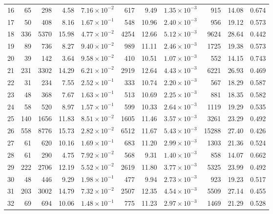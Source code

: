 \begin{table}[ht]
\begin{adjustbox}{width=\textwidth}
\begin{tabular}{lrrrrrrrrrr}
  16 & 65 & 298 & 4.58 & $7.16 \times 10^{-2}$ & 617 & 9.49 & $1.35 \times 10^{-3}$ & 915 & 14.08 & 0.674 \\ 
  17 & 50 & 408 & 8.16 & $1.67 \times 10^{-1}$ & 548 & 10.96 & $2.40 \times 10^{-3}$ & 956 & 19.12 & 0.573 \\ 
  18 & 336 & 5370 & 15.98 & $4.77 \times 10^{-2}$ & 4254 & 12.66 & $5.12 \times 10^{-3}$ & 9624 & 28.64 & 0.442 \\ 
  19 & 89 & 736 & 8.27 & $9.40 \times 10^{-2}$ & 989 & 11.11 & $2.46 \times 10^{-3}$ & 1725 & 19.38 & 0.573 \\ 
  20 & 39 & 142 & 3.64 & $9.58 \times 10^{-2}$ & 410 & 10.51 & $1.07 \times 10^{-3}$ & 552 & 14.15 & 0.743 \\ 
  21 & 231 & 3302 & 14.29 & $6.21 \times 10^{-2}$ & 2919 & 12.64 & $4.43 \times 10^{-3}$ & 6221 & 26.93 & 0.469 \\ 
  22 & 31 & 234 & 7.55 & $2.52 \times 10^{-1}$ & 333 & 10.74 & $2.20 \times 10^{-3}$ & 567 & 18.29 & 0.587 \\ 
  23 & 48 & 368 & 7.67 & $1.63 \times 10^{-1}$ & 513 & 10.69 & $2.25 \times 10^{-3}$ & 881 & 18.35 & 0.582 \\ 
  24 & 58 & 520 & 8.97 & $1.57 \times 10^{-1}$ & 599 & 10.33 & $2.64 \times 10^{-3}$ & 1119 & 19.29 & 0.535 \\ 
  25 & 140 & 1656 & 11.83 & $8.51 \times 10^{-2}$ & 1605 & 11.46 & $3.57 \times 10^{-3}$ & 3261 & 23.29 & 0.492 \\ 
  26 & 558 & 8776 & 15.73 & $2.82 \times 10^{-2}$ & 6512 & 11.67 & $5.43 \times 10^{-3}$ & 15288 & 27.40 & 0.426 \\ 
  27 & 61 & 620 & 10.16 & $1.69 \times 10^{-1}$ & 683 & 11.20 & $2.99 \times 10^{-3}$ & 1303 & 21.36 & 0.524 \\ 
  28 & 61 & 290 & 4.75 & $7.92 \times 10^{-2}$ & 568 & 9.31 & $1.40 \times 10^{-3}$ & 858 & 14.07 & 0.662 \\ 
  29 & 222 & 2706 & 12.19 & $5.52 \times 10^{-2}$ & 2619 & 11.80 & $3.77 \times 10^{-3}$ & 5325 & 23.99 & 0.492 \\ 
  30 & 48 & 446 & 9.29 & $1.98 \times 10^{-1}$ & 477 & 9.94 & $2.73 \times 10^{-3}$ & 923 & 19.23 & 0.517 \\ 
  31 & 203 & 3002 & 14.79 & $7.32 \times 10^{-2}$ & 2507 & 12.35 & $4.54 \times 10^{-3}$ & 5509 & 27.14 & 0.455 \\ 
  32 & 69 & 694 & 10.06 & $1.48 \times 10^{-1}$ & 775 & 11.23 & $2.97 \times 10^{-3}$ & 1469 & 21.29 & 0.528 \\ 

\end{tabular}
\end{adjustbox}
\end{table}
